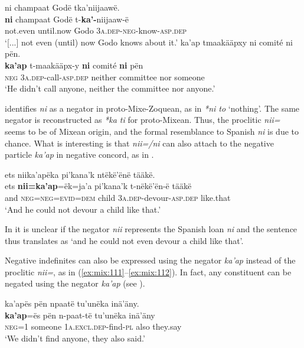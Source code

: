 \documentclass[output=paper,colorlinks,citecolor=brown,draft]{langscibook}
\begin{document}
\ea\label{ex:mix:109}
    \ea\label{ex:mix:109a}
        \glll ni champaat Godë tka’niijaawë.\\ 
              \textbf{ni} champaat Godë t-\textbf{ka’-}niijaaw-ë\\
              not.even until.now Godo \textsc{3a.dep}-\textsc{neg}{}-know-\textsc{asp.dep}\\
        \glt ‘[...] not even (until) now Godo knows about it.’
    \ex\label{ex:mix:109b}
        \glll ka’ap tmaakääpxy ni comité ni pën.\\
             \textbf{ka’ap} t-maakääpx-y \textbf{ni} comité \textbf{ni} pën\\
             \textsc{neg} \textsc{3a.dep}{}-call-\textsc{asp.dep} neither committee nor someone\\
        \glt ‘He didn’t call anyone, neither the committee nor anyone.’ 
    \z
\z 

\citet[572]{Wichmann1995} identifies \textit{ni} as a negator in proto-Mixe-Zoquean, as in \textit{*ni to} ‘nothing’. The same negator is reconstructed as \textit{*ka ti} for proto-Mixean. Thus, the proclitic \textit{nii=} seems to be of Mixean origin, and the formal resemblance to Spanish \textit{ni} is due to chance. What is interesting is that \textit{nii=/ni} can also attach to the negative particle \textit{ka’ap} in negative concord, as in .

\ea\label{ex:mix:110}
    \glll ets niika’apëka pi’kana’k ntëkë’ënë tääkë. \\
          ets \textbf{nii=ka’ap}=ëk=ja’a pi’kana’k t-nëkë’ën-ë tääkë \\
          and \textsc{neg=neg=evid=dem} child \textsc{3a.dep}{}-devour-\textsc{asp.dep} like.that\\
    \glt ‘And he could not devour a child like that.’
\z

In  it is unclear if the negator \textit{nii} represents the Spanish loan \textit{ni} and the sentence thus translates as ‘and he could not even devour a child like that’. 

Negative indefinites can also be expressed using the negator \textit{ka’ap} instead of the proclitic \textit{nii=}, as in (\ref{ex:mix:111}--\ref{ex:mix:112}). In fact, any constituent can be negated using the negator \textit{ka’ap} (see ).

\ea\label{ex:mix:111}
    \glll ka’apës pën npaatë tu’unëka inä’äny. \\
          \textbf{ka’ap}=ës pën n-paat-të tu’unëka inä’äny  \\
          \textsc{neg=1} someone 1\textsc{a.excl.dep-}find-\textsc{pl} also they.say \\
    \glt ‘We didn’t find anyone, they also said.’
\z
\end{document}
